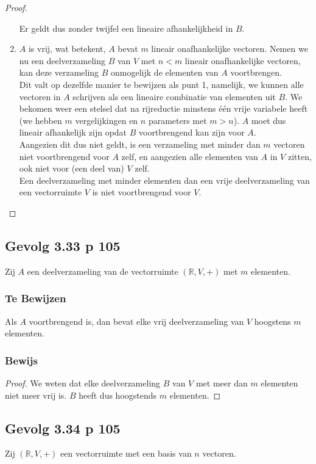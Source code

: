 \documentclass[lineaire_algebra_oplossingen.tex]{subfiles}
\begin{document}
\begin{proof}
\begin{enumerate}
Er geldt dus zonder twijfel een lineaire afhankelijkheid in $B$.
\item
$A$ is vrij, wat betekent, $A$ bevat $m$ lineair onafhankelijke vectoren. Nemen we nu een deelverzameling $B$ van $V$ met $n<m$ lineair onafhankelijke vectoren, kan deze verzameling $B$ onmogelijk de elementen van $A$ voortbrengen.\\
Dit valt op dezelfde manier te bewijzen als punt 1, namelijk, we kunnen alle vectoren in $A$ schrijven als een lineaire combinatie van elementen uit $B$. We bekomen weer een stelsel dat na rijreductie minstens \'e\'en vrije variabele heeft (we hebben $m$ vergelijkingen en $n$ parameters met $m>n$). $A$ moet dus lineair afhankelijk zijn opdat $B$ voortbrengend kan zijn voor $A$.\\ Aangezien dit dus niet geldt, is een verzameling met minder dan $m$ vectoren niet voortbrengend voor $A$ zelf, en aangezien alle elementen van $A$ in $V$ zitten, ook niet voor (een deel van) $V$ zelf.\\
Een deelverzameling met minder elementen dan een vrije deelverzameling van een vectorruimte $V$ is niet voortbrengend voor $V$.
\end{enumerate}
\end{proof}


\subsection{Gevolg 3.33 p 105}
\label{3.33}
Zij $A$ een deelverzameling van de vectorruimte $(\mathbb{R},V,+)$ met $m$ elementen.

\subsubsection*{Te Bewijzen}
Als $A$ voortbrengend is, dan bevat elke vrij deelverzameling van $V$ hoogstens $m$ elementen.

\subsubsection*{Bewijs}
\begin{proof}
We weten dat elke deelverzameling $B$ van $V$ met meer dan $m$ elementen niet meer vrij is. $B$ heeft dus hoogstends $m$ elementen.
\end{proof}


\subsection{Gevolg 3.34 p 105}
\label{3.34}
Zij $(\mathbb{R},V,+)$ een vectorruimte met een basis van $n$ vectoren.
\end{document}
